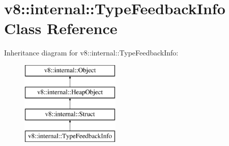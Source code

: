 \hypertarget{classv8_1_1internal_1_1_type_feedback_info}{}\section{v8\+:\+:internal\+:\+:Type\+Feedback\+Info Class Reference}
\label{classv8_1_1internal_1_1_type_feedback_info}
Inheritance diagram for v8\+:\+:internal\+:\+:Type\+Feedback\+Info\+:\begin{figure}[H]
\begin{center}
\leavevmode
\includegraphics[height=4.000000cm]{classv8_1_1internal_1_1_type_feedback_info}
\end{center}
\end{figure}
